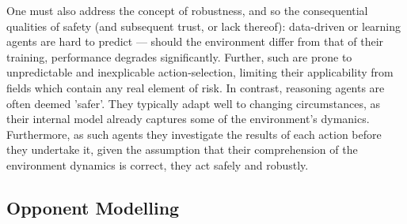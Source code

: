 \newline \newline
One must also address the concept of robustness, and so the consequential qualities of safety (and subsequent trust, or lack thereof): data-driven or learning agents are hard to predict --- should the environment differ from that of their training, performance degrades significantly. 
Further, such are prone to unpredictable and inexplicable action-selection, limiting their applicability from fields which contain any real element of risk. In contrast, reasoning agents are often deemed 'safer'. 
They typically adapt well to changing circumstances, as their internal model already captures some of the environment's dymanics. 
Furthermore, as such agents they investigate the results of each action before they undertake it, given the assumption that their comprehension of the environment dynamics is correct, they act safely and robustly.

\subsection{Opponent Modelling}


